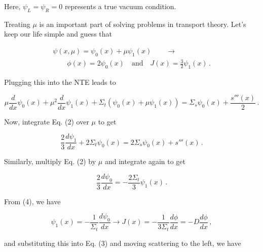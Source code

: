 \documentclass[compact]{ne630handout}
\begin{document}
\begin{handoutflow}
Here, $\psi_L = \psi_R = 0$ represents a true vacuum condition.


Treating $\mu$ is an important part of solving problems in transport theory.  Let's keep our life simple and guess that


\begin{equation*}
\begin{aligned}
\psi(x, \mu) = \psi_0(x) + \mu \psi_1(x) \qquad \longrightarrow \\ \qquad \phi(x) = 2\psi_0(x) \quad \text{and} \quad J(x) = \frac{3}{2}\psi_1(x) \, .
\end{aligned}
\end{equation*}

Plugging this into the NTE leads to


\begin{equation*}
\displaystyle \mu \frac{d}{d x} \psi_{0}{\left(x \right)} +  \mu^{2} \frac{d}{d x} \psi_{1}{\left(x \right)}  + \Sigma_{t} ( \psi_{0}{\left(x \right)} + \mu \psi_{1}{\left(x \right)} ) = \Sigma_{s} \psi_{0}{\left(x \right)} + \frac{s'''{\left(x \right)}}{2} \, .
  \tag{2}
\end{equation*}

Now, integrate Eq. (2) over $\mu$ to get


\begin{equation*}
\frac{2}{3}\frac{d \psi_1}{dx} + 2\Sigma_t \psi_0(x) = 2\Sigma_s \psi_0(x) + s'''(x) \, .
  \tag{3}
\end{equation*}

Similarly, multiply Eq. (2) by $\mu$ and integrate again to get


\begin{equation*}
\frac{2}{3} \frac{d\psi_0}{dx} = -\frac{2\Sigma_t}{3} \psi_1(x) \, .
  \tag{4}
\end{equation*}

From (4), we have


\begin{equation*}
\psi_1(x) = -\frac{1}{\Sigma_t} \frac{d\psi_0}{dx} \longrightarrow \boxed{J(x)
    = -\frac{1}{3\Sigma_t} \frac{d\phi}{dx} = -D \frac{d\phi}{dx} } \, ,
  \tag{5}
\end{equation*}

and substituting this into Eq. (3) and moving scattering to the left, we have



\end{handoutflow}
\end{document}
